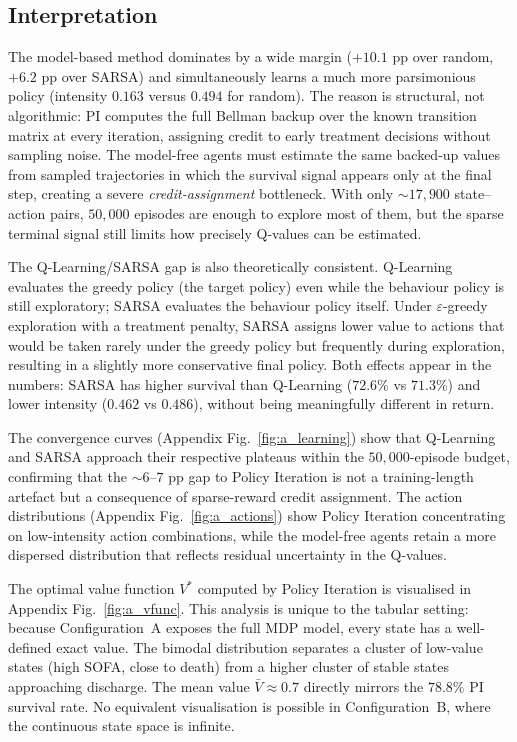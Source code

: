 \documentclass[11pt,a4paper]{article}
\begin{document}
\subsection{Interpretation}

The model-based method dominates by a wide margin ($+10.1$ pp over random, $+6.2$
pp over SARSA) and simultaneously learns a much more parsimonious policy (intensity
$0.163$ versus $0.494$ for random). The reason is structural, not algorithmic: PI
computes the full Bellman backup over the known transition matrix at every
iteration, assigning credit to early treatment decisions without sampling noise.
The model-free agents must estimate the same backed-up values from sampled
trajectories in which the survival signal appears only at the final step, creating
a severe \emph{credit-assignment} bottleneck. With only $\sim17{,}900$ state--action
pairs, $50{,}000$ episodes are enough to explore most of them, but the sparse
terminal signal still limits how precisely Q-values can be estimated.

The Q-Learning/SARSA gap is also theoretically consistent. Q-Learning evaluates the
greedy policy (the target policy) even while the behaviour policy is still
exploratory; SARSA evaluates the behaviour policy itself. Under $\varepsilon$-greedy
exploration with a treatment penalty, SARSA assigns lower value to actions that would
be taken rarely under the greedy policy but frequently during exploration, resulting
in a slightly more conservative final policy. Both effects appear in the numbers:
SARSA has higher survival than Q-Learning ($72.6\%$ vs $71.3\%$) and lower
intensity ($0.462$ vs $0.486$), without being meaningfully different in return.

The convergence curves (Appendix Fig.~\ref{fig:a_learning}) show that Q-Learning
and SARSA approach their respective plateaus within the $50{,}000$-episode budget,
confirming that the $\sim6$--$7$ pp gap to Policy Iteration is not a training-length
artefact but a consequence of sparse-reward credit assignment. The action
distributions (Appendix Fig.~\ref{fig:a_actions}) show Policy Iteration
concentrating on low-intensity action combinations, while the model-free agents
retain a more dispersed distribution that reflects residual uncertainty in the
Q-values.

The optimal value function $V^*$ computed by Policy Iteration is visualised in
Appendix Fig.~\ref{fig:a_vfunc}. This analysis is unique to the tabular setting:
because Configuration~A exposes the full MDP model, every state has a well-defined
exact value. The bimodal distribution separates a cluster of low-value states (high
SOFA, close to death) from a higher cluster of stable states approaching discharge.
The mean value $\bar{V}\approx0.7$ directly mirrors the $78.8\%$ PI survival rate.
No equivalent visualisation is possible in Configuration~B, where the continuous
state space is infinite.
\end{document}
